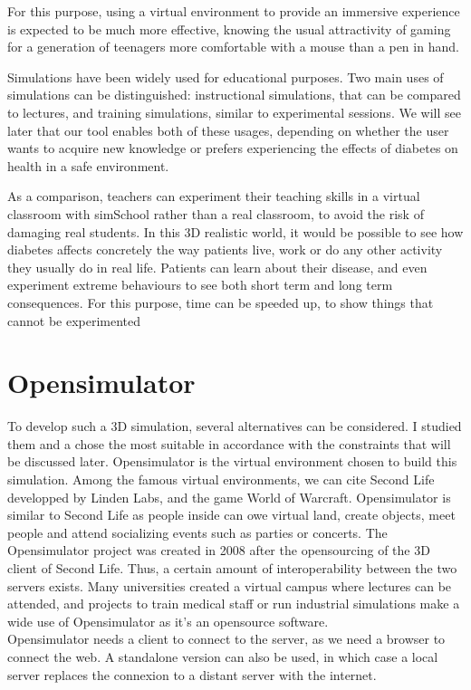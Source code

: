 \documentclass[12pt,MSc]{muthesis}
\begin{document}
For this purpose, using a virtual environment to provide an immersive experience is expected to be much more effective, knowing the usual attractivity of gaming for a generation of teenagers more comfortable with a mouse than a pen in hand. 

Simulations have been widely used for educational purposes. Two main uses of simulations can be distinguished: instructional simulations, that can be compared to lectures, and training simulations, similar to experimental sessions. We will see later that our tool enables both of these usages, depending on whether the user wants to acquire new knowledge or prefers experiencing the effects of diabetes on health in a safe environment.

As a comparison, teachers can experiment their teaching skills in a virtual classroom with simSchool rather than a real classroom, to avoid the risk of damaging real students. In this 3D realistic world, it would be possible to see how diabetes affects concretely the way patients live, work or do any other activity they usually do in real life. Patients can learn about their disease, and even experiment extreme %
behaviours to see both short term and long term consequences. For this purpose, time can be speeded up, to show things that cannot be experimented %
\section{Opensimulator}
To develop such a 3D simulation, several alternatives can be considered. I studied them and a chose the most suitable in accordance with the constraints that will be discussed later.
Opensimulator is the virtual environment chosen to build this simulation. Among the famous virtual environments, we can cite Second Life developped by Linden Labs, and the game World of Warcraft. 
Opensimulator is similar to Second Life as people inside can owe virtual land, create objects, meet people and attend socializing events such as parties or concerts. The Opensimulator project was created in 2008 after the opensourcing of the 3D client of Second Life. Thus, a certain amount of interoperability between the two servers exists. Many universities created a virtual campus where lectures can be attended, and projects to train medical staff or run industrial simulations make a wide use of Opensimulator as it's an opensource software.
\\Opensimulator needs a client to connect to the server, as we need a browser to connect the web. A standalone version can also be used, in which case a local server %
replaces the connexion to a distant server with the internet.
\end{document}
